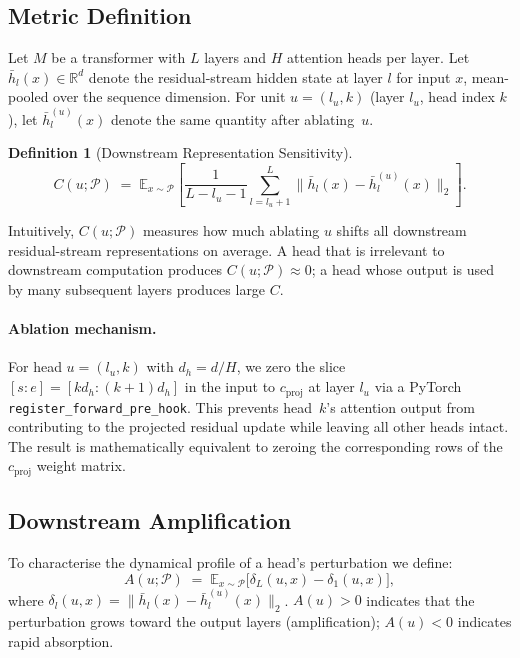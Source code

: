 \documentclass[11pt,a4paper]{article}
\newcommand{\R}{\mathbb{R}}
\newcommand{\E}{\mathbb{E}}
\newcommand{\hb}{\bar{h}}
\theoremstyle{definition}
\newtheorem{definition}{Definition}[section]
\theoremstyle{plain}
\begin{document}
\subsection{Metric Definition}
\label{sec:definition}

Let $M$ be a transformer with $L$ layers and $H$ attention heads per layer.
Let $\hb_l(x) \in \R^{d}$ denote the residual-stream hidden state at
layer $l$ for input $x$, mean-pooled over the sequence dimension.
For unit $u = (l_u, k)$ (layer $l_u$, head index $k$), let
$\hb_l^{(u)}(x)$ denote the same quantity after ablating~$u$.

\begin{definition}[Downstream Representation Sensitivity]
\label{def:bridge}
\begin{equation}
    C(u;\mathcal{P}) \;=\;
    \E_{x \sim \mathcal{P}}\!\left[
        \frac{1}{L - l_u - 1}
        \sum_{l=l_u+1}^{L}
        \bigl\| \hb_l(x) - \hb_l^{(u)}(x) \bigr\|_2
    \right].
    \label{eq:bridge}
\end{equation}
\end{definition}

Intuitively, $C(u;\mathcal{P})$ measures how much ablating $u$ shifts all
downstream residual-stream representations on average.
A head that is irrelevant to downstream computation produces
$C(u;\mathcal{P}) \approx 0$; a head whose output is used by many
subsequent layers produces large $C$.

\paragraph{Ablation mechanism.}
For head $u=(l_u,k)$ with $d_h = d/H$, we zero the slice
$[s\!:\!e] = [k d_h\!:\!(k\!+\!1)d_h]$ in the input to
$c_{\text{proj}}$ at layer $l_u$ via a PyTorch
\texttt{register\_forward\_pre\_hook}.
This prevents head~$k$'s attention output from contributing to the
projected residual update while leaving all other heads intact.
The result is mathematically equivalent to zeroing the corresponding rows
of the $c_{\text{proj}}$ weight matrix.

\subsection{Downstream Amplification}
\label{sec:amp_def}

To characterise the dynamical profile of a head's perturbation we define:
\begin{equation}
    A(u;\mathcal{P}) \;=\;
    \E_{x \sim \mathcal{P}}\!\bigl[
        \delta_L(u,x) - \delta_1(u,x)
    \bigr],
    \label{eq:amp}
\end{equation}
where $\delta_l(u,x) = \|\hb_l(x) - \hb_l^{(u)}(x)\|_2$.
$A(u) > 0$ indicates that the perturbation grows toward the output layers
(amplification); $A(u) < 0$ indicates rapid absorption.
\end{document}
